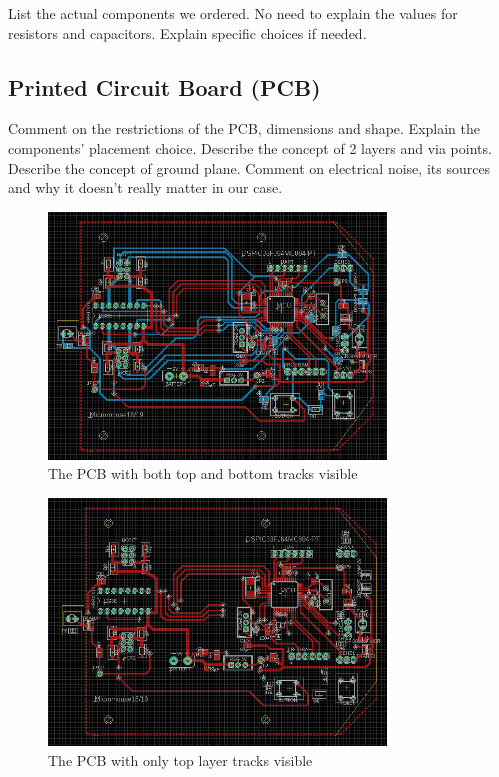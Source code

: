 List the actual components we ordered.
No need to explain the values for resistors and capacitors.
Explain specific choices if needed.


\subsection{Printed Circuit Board (PCB)}

Comment on the restrictions of the PCB, dimensions and shape.
Explain the components' placement choice.
Describe the concept of 2 layers and via points.
Describe the concept of ground plane.
Comment on electrical noise, its sources and why it doesn't really matter in our case.

\begin{figure}[htb]
    \centering
    \includegraphics[width=0.8\textwidth]{figures/hardware/PCB.PNG}
    \caption{The PCB with both top and bottom tracks visible}
    \label{fig:pcb}
\end{figure}

\begin{figure}[htb]
    \centering
    \includegraphics[width=0.8\textwidth]{figures/hardware/PCB_Top.PNG}
    \caption{The PCB with only top layer tracks visible}
    \label{fig:top}
\end{figure}

